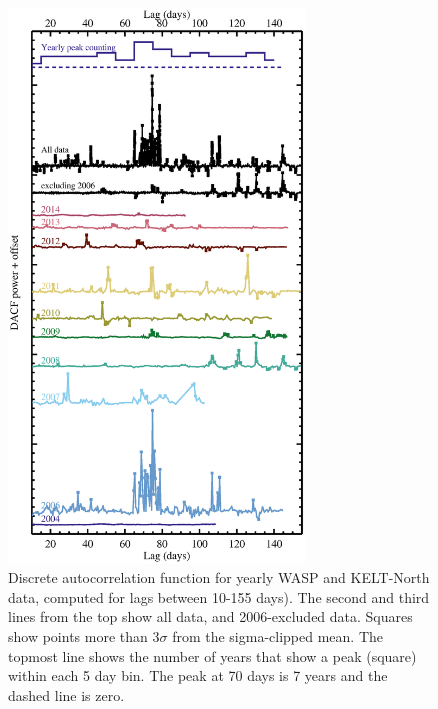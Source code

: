 \documentclass[]{rsos}
\begin{document}
\begin{figure}
\begin{center}
\hspace{-0.5cm} \includegraphics[width=0.7\textwidth]{figs/auto.eps}
\caption{Discrete autocorrelation function for yearly WASP and KELT-North data, computed for
  lags between 10-155 days). The second and third lines from the top show all data, and
  2006-excluded data. Squares show points more than 3$\sigma$ from the sigma-clipped
  mean. The topmost line shows the number of years that show a peak (square) within each
  5 day bin. The peak at 70 days is 7 years and the dashed line is zero.}\label{fig:auto}
\end{center}
\end{figure}
\end{document}
